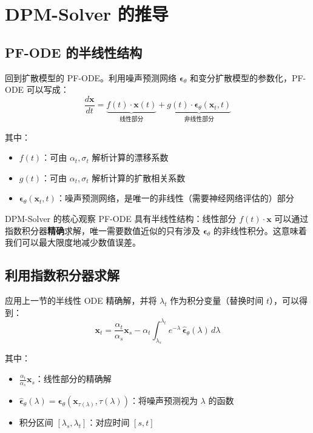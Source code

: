 \section{DPM-Solver 的推导}

\subsection{PF-ODE 的半线性结构}

回到扩散模型的 PF-ODE。利用噪声预测网络 $\boldsymbol{\epsilon}_\theta$ 和变分扩散模型的参数化，PF-ODE 可以写成：
$$\frac{d\mathbf{x}}{dt} = \underbrace{f(t) \cdot \mathbf{x}(t)}_{\text{线性部分}} + \underbrace{g(t) \cdot \boldsymbol{\epsilon}_\theta(\mathbf{x}_t, t)}_{\text{非线性部分}}$$

其中：
\begin{itemize}
    \item $f(t)$：可由 $\alpha_t, \sigma_t$ 解析计算的漂移系数
    \item $g(t)$：可由 $\alpha_t, \sigma_t$ 解析计算的扩散相关系数
    \item $\boldsymbol{\epsilon}_\theta(\mathbf{x}_t, t)$：噪声预测网络，是唯一的非线性（需要神经网络评估的）部分
\end{itemize}

\begin{importantbox}{DPM-Solver 的核心观察}
PF-ODE 具有半线性结构：线性部分 $f(t) \cdot \mathbf{x}$ 可以通过指数积分器\textbf{精确}求解，唯一需要数值近似的只有涉及 $\boldsymbol{\epsilon}_\theta$ 的非线性积分。这意味着我们可以最大限度地减少数值误差。
\end{importantbox}

\subsection{利用指数积分器求解}

应用上一节的半线性 ODE 精确解，并将 $\lambda_t$ 作为积分变量（替换时间 $t$），可以得到：
$$\mathbf{x}_t = \frac{\alpha_t}{\alpha_s} \mathbf{x}_s - \alpha_t \int_{\lambda_s}^{\lambda_t} e^{-\lambda}\, \hat{\boldsymbol{\epsilon}}_\theta(\lambda)\, d\lambda$$

其中：
\begin{itemize}
    \item $\frac{\alpha_t}{\alpha_s} \mathbf{x}_s$：线性部分的精确解
    \item $\hat{\boldsymbol{\epsilon}}_\theta(\lambda) = \boldsymbol{\epsilon}_\theta(\mathbf{x}_{\tau(\lambda)}, \tau(\lambda))$：将噪声预测视为 $\lambda$ 的函数
    \item 积分区间 $[\lambda_s, \lambda_t]$：对应时间 $[s, t]$
\end{itemize}

